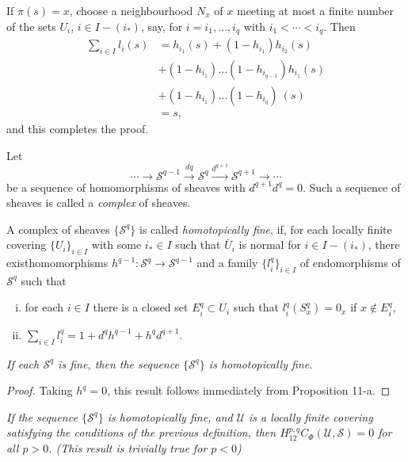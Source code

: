 If $\pi(s) = x$, choose a neighbourhood $N_x$ of $x$ meeting at most a
finite number of the sets $U_i$, $i \in I - (i_*)$, say, for $i = i_1,
\ldots, i_q$ with $i_1 < \cdots < i_q$. Then 
\begin{align*}
\sum_{i \in I} l_i (s) & = h_{i_1} (s) + (1-h_{i_1}) h_{i_2}(s)\\ 
& + (1 - h_{i_1}) \dots (1 - h_{i_{q-1}}) h_{i_1} (s)\\
& + (1 - h_{i_1}) \dots (1-h_{i_q}) ~ (s)\\
& = s,
\end{align*}
and this completes the proof.

Let 
$$\cdots \rightarrow \mathscr{S}^{q-1} \xrightarrow{dq}
\mathscr{S}^q \xrightarrow{d^{q+1}} \mathscr{S}^{q+1} \rightarrow
\cdots
$$
 be a sequence of homomorphisms of sheaves with $d^{q+1} d^q =
0$. Such a sequence of sheaves is called a \textit{complex} of
sheaves. 

\begin{defi*} %
A complex of sheaves $\{\mathscr{S}^q \}$ is called {\em{homotopically
    fine}}, if, for each locally finite covering $\{U_i \}_{i \in I}$
with some $i_* \in I$ such that $\bar{U}_i$ is normal for $i \in I -
(i_*)$, there exist\pageoriginale homomorphisms $h^{q-1} :
\mathscr{S}^q \rightarrow \mathscr{S}^{q-1}$ and a family
$\{l^q_i\}_{i \in I}$ of endomorphisms of $\mathscr{S}^q$ such that   
\begin{enumerate}[(i)]
\item for each $i \in I$ there is a closed set $E^q_i \subset U_i$
  such that $l^q_i (S^q_x) = 0_x$ if $x \notin E^q_i$,  

\item $\sum\limits_{i \in I} l^q_i = 1 + d^q h^{q-1} + h^q d^{q+1}$. 
\end{enumerate}
\end{defi*}

\textit{If each $\mathscr{S}^q$ is fine, then the sequence $\{
  \mathscr{S}^q\}$ is homotopically fine}. 

\begin{proof}%
Taking $h^q = 0$, this result follows immediately from Proposition 11-a. 
\end{proof}

\textit{If the sequence $\{ \mathscr{S}^q\}$ is homotopically fine,
  and $\mathscr{U}$ is a locally finite covering satisfying the
  conditions of the previous definition, then $H^{p,q}_{12} C_\Phi 
  (\mathscr{U}, \mathscr{S}) = 0$ for all $p > 0$. (This result is
  trivially true for $p < 0$)} 

